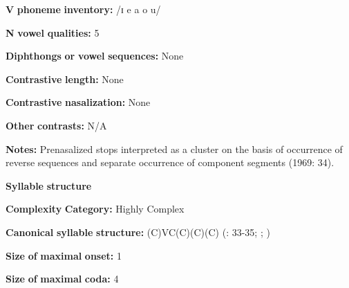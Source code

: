 \begin{styleBody}
\textbf{V} \textbf{phoneme} \textbf{inventory:} /ɪ e a o u/
\end{styleBody}

\begin{styleBody}
\textbf{N} \textbf{vowel} \textbf{qualities:} 5
\end{styleBody}

\begin{styleBody}
\textbf{Diphthongs} \textbf{or} \textbf{vowel} \textbf{sequences:} None
\end{styleBody}

\begin{styleBody}
\textbf{Contrastive} \textbf{length:} None
\end{styleBody}

\begin{styleBody}
\textbf{Contrastive} \textbf{nasalization:} None
\end{styleBody}

\begin{styleBody}
\textbf{Other} \textbf{contrasts:} N/A
\end{styleBody}

\begin{styleBody}
\textbf{Notes:} Prenasalized stops interpreted as a cluster on the basis of occurrence of reverse sequences and separate occurrence of component segments (1969: 34).
\end{styleBody}

\begin{styleBody}
\textbf{Syllable} \textbf{structure}
\end{styleBody}

\begin{styleBody}
\textbf{Complexity} \textbf{Category:} Highly Complex
\end{styleBody}

\begin{styleBody}
\textbf{Canonical} \textbf{syllable} \textbf{structure:} (C)VC(C)(C)(C) (\citealt{Summer1969}: 33-35; \citealt{Sommer1981}; \citealt{Dixon1970})
\end{styleBody}

\begin{styleBody}
\textbf{Size} \textbf{of} \textbf{maximal} \textbf{onset:} 1
\end{styleBody}

\begin{styleBody}
\textbf{Size} \textbf{of} \textbf{maximal} \textbf{coda:} 4
\end{styleBody}

